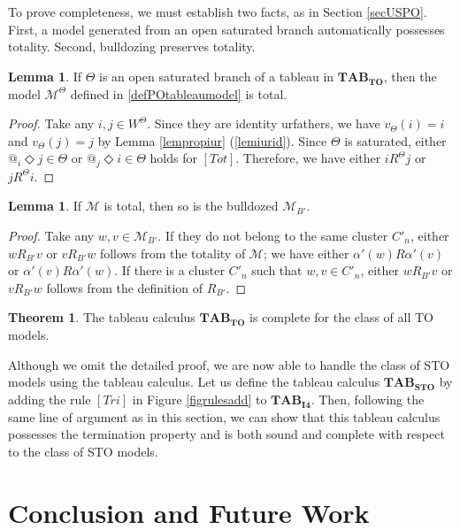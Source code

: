 \documentclass{article}
\theoremstyle{definition}
\newtheorem{lemma}[definition]{Lemma}
\newtheorem{theorem}[definition]{Theorem}
\newcommand{\Dia}{\Diamond}
\newcommand{\Kmodel}{\mathcal{M}}
\newcommand{\trich}{\mathit{Tri}}
\newcommand{\total}{\mathit{Tot}}
\newcommand{\tableauIF}{\mathbf{TAB}_{\mathbf{I4}}}
\newcommand{\tableauIFT}{\mathbf{TAB}_{\textbf{STO}}}
\newcommand{\tableauTO}{\mathbf{TAB}_{\textbf{TO}}}
\begin{document}
To prove completeness, we must establish two facts, as in Section \ref{secUSPO}.
First, a model generated from an open saturated branch automatically possesses totality.
Second, bulldozing preserves totality.

\begin{lemma}
    If $\Theta$ is an open saturated branch of a tableau in $\tableauTO$, then the model $\Kmodel^\Theta$ defined in \ref{defPOtableaumodel} is total.
    \label{lem:branch-model-is-total}
\end{lemma}
\begin{proof}
    Take any $i, j \in W^\Theta$.
    Since they are identity urfathers, we have $v_\Theta(i) = i$ and $v_\Theta(j) = j$ by Lemma \ref{lempropiur} (\ref{lemiurid}). 
    Since $\Theta$ is saturated, either $@_i \Dia j \in \Theta$ or $@_j \Dia i \in \Theta$ holds for $[\total]$.
    Therefore, we have either $i R^\Theta j$ or $j R^\Theta i$.
\end{proof}

\begin{lemma}
    If $\Kmodel$ is total, then so is the bulldozed $\Kmodel_{B'}$.
    \label{lem:bulldoze-preserves-totality}
\end{lemma}
\begin{proof}
    Take any $w, v \in \Kmodel_{B'}$.
    If they do not belong to the same cluster $C'_n$, either $w R_{B'} v$ or $v R_{B'} w$ follows from the totality of $\Kmodel$; we have either $\alpha'(w) R \alpha'(v)$ or $\alpha'(v) R \alpha'(w)$.
    If there is a cluster $C'_n$ such that $w, v \in C'_n$, either $w R_{B'} v$ or $v R_{B'} w$ follows from the definition of $R_{B'}$.
\end{proof}

\begin{theorem}
    The tableau calculus $\tableauTO$ is complete for the class of all TO models.
    \label{thm:completeTO}
\end{theorem}

Although we omit the detailed proof, we are now able to handle the class of STO models using the tableau calculus. Let us define the tableau calculus $\tableauIFT$ by adding the rule $[\trich]$ in Figure \ref{figrulesadd} to $\tableauIF$. Then, following the same line of argument as in this section, we can show that this tableau calculus possesses the termination property and is both sound and complete with respect to the class of STO models.

\section{Conclusion and Future Work}
\label{secfuture}
\end{document}
